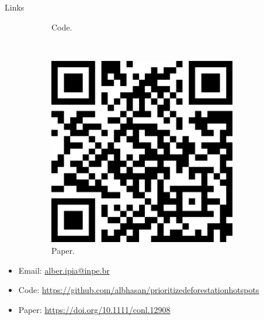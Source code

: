 \documentclass[20pt]{beamer}
\begin{document}
\begin{frame}[fragile,t]
\begin{columns}[t]
\begin{column}{0.33\linewidth}
\begin{block}{Links}
\begin{figure}
\begin{subfigure}[b]{0.2\textwidth}
{Code.}
    \end{subfigure}
    ~
    \begin{subfigure}[b]{0.2\textwidth}
\centering
\includegraphics[width=0.90\textwidth]{fig_poster/qrcode_link_conservation-letters_science-based-planning.png}\\
{Paper.}
    \end{subfigure}
\end{figure}
\vspace{0.4cm}    

\begin{itemize}
\item Email: 
\href{mailto:alber.ipia@inpe.br}{alber.ipia@inpe.br} 
\item Code: {\scriptsize\url{https://github.com/albhasan/prioritizedeforestationhotspots}}
\item Paper:
{\footnotesize\url{
 https://doi.org/10.1111/conl.12908
 }}
\end{itemize}

    \end{block}
\end{column}


\end{columns}
\end{frame}
\end{document}
